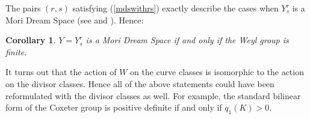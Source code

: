 \documentclass[12pt]{article}
\newtheorem{corollary}[equation]{Corollary}
\numberwithin{equation}{section}
\numberwithin{subeq}{equation}
\begin{document}
The pairs $(r,s)$ satisfying (\ref{mdswithrs}) exactly describe the cases when $Y^r_s$ is a Mori Dream Space (see \cite{Mu05} and \cite{CT}).
Hence:
\begin{corollary} \label{mds}
$Y=Y^r_s$ is a Mori Dream Space if and only if the Weyl group is finite.
\end{corollary}


It turns out that the action of $W$ on the curve classes
is isomorphic to the action on the divisor classes.
Hence all of the above statements could have been reformulated
with the divisor classes as well.
For example, the standard bilinear form of the Coxeter group
is positive definite if and only if $q_{1}(K) >0$.

\end{document}
